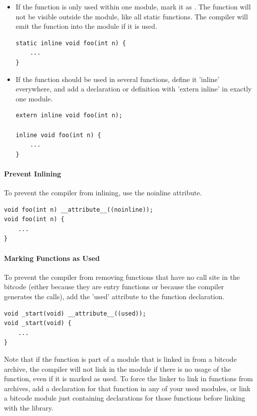 \begin{itemize}
\item If the function is only used within one module, mark it as .
The function will not be visible outside the module, like all static functions. The compiler will emit the 
function into the module if it is used.

\begin{verbatim}
static inline void foo(int n) {
    ...
}
\end{verbatim}

\item If the function should be used in several functions, define it 'inline' everywhere,
  and add a declaration or definition with 'extern inline' in exactly one module.

\begin{verbatim}
extern inline void foo(int n);

inline void foo(int n) {
    ...
}
\end{verbatim}
\end{itemize}

\paragraph{Prevent Inlining}
To prevent the compiler from inlining, use the noinline attribute.

\begin{verbatim}
void foo(int n) __attribute__((noinline));
void foo(int n) {
    ...
}
\end{verbatim}

\paragraph{Marking Functions as Used}
To prevent the compiler from removing functions that have no call site in the bitcode
(either because they are entry functions or because the compiler generates the calls),
add the 'used' attribute to the function declaration.

\begin{verbatim}
void _start(void) __attribute__((used));
void _start(void) {
    ...
}
\end{verbatim}

Note that if the function is part of a module that is linked in from a bitcode archive,
the compiler will not link in the module if there is no usage of the function, even if it
is marked as used. To force the linker to link in functions from archives, add a declaration
for that function in any of your used modules, or link a bitcode module just containing declarations
for those functions before linking with the library.



